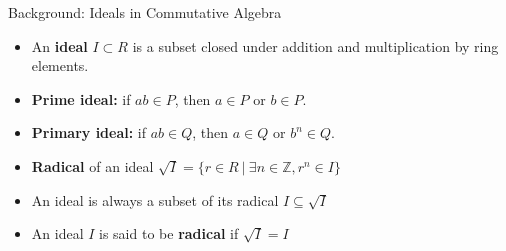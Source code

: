 \documentclass[11pt]{beamer}
\begin{document}
\begin{frame}{Background: Ideals in Commutative Algebra}
\begin{itemize}
  \item An \textbf{ideal} $I \subset R$ is a subset closed under addition and multiplication by ring elements.
  \item \textbf{Prime ideal:} if $ab \in P$, then $a \in P$ or $b \in P$.
  \item \textbf{Primary ideal:} if $ab \in Q$, then $a \in Q$ or $b^n \in Q$.
  \item \textbf{Radical} of an ideal $\sqrt{I} = \{ r \in R \ | \ \exists n \in \mathbb{Z}, r^n \in I\}$
  \item An ideal is always a subset of its radical $I \subseteq \sqrt{I}$
  \item An ideal $I$ is said to be \textbf{radical} if $\sqrt{I} = I$
\end{itemize}
\end{frame}
\end{document}
